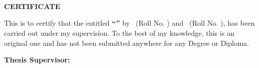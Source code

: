 %
%

\clearpage
\thispagestyle{fancy}
{}

\begin{center}
{\fontsize{11}{13}\selectfont \universitymotto}\\[4pt]
\ruetlogobwbox{0.85in}\\[8pt]
{\fontsize{16}{19}\selectfont \textbf{\departmentname}}\\[2pt]
{\fontsize{16}{19}\selectfont \textbf{\universityname}}
\end{center}

\vspace{0.5in}

\begin{center}
{\fontsize{16}{19}\selectfont \textbf{CERTIFICATE}}
\end{center}

\vspace{0.15in}

This is to certify that the \MakeLowercase{\worktype} entitled
\textbf{``\thesistitle''} by \studentname\ (Roll No. \studentroll) and
\studentnametwo\ (Roll No. \studentrolltwo), has been
carried out under my supervision. To the best of my knowledge, this
\MakeLowercase{\worktype} is an original one and has not been submitted
anywhere for any Degree or Diploma.

\vspace{0.9in}

\noindent\textbf{Thesis Supervisor:}

\vspace{0.35in}

\noindent
\signaturedots\\
\textbf{\supervisorname}\\
\supervisordesignation\\
\supervisordepartment\\
\supervisoruniversity\\
\universitylocation

\clearpage
